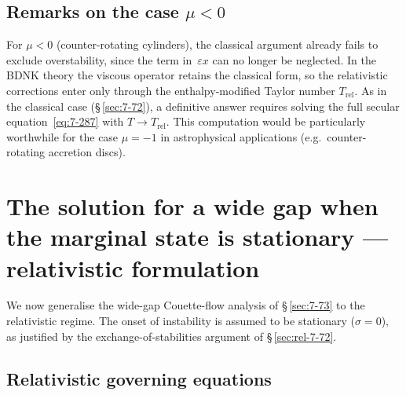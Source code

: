 \subsection{Remarks on the case $\mu < 0$}
\label{sec:rel-7-72c}

For $\mu < 0$ (counter-rotating cylinders), the classical argument
already fails to exclude overstability, since the term in~$\varepsilon x$
can no longer be neglected.  In the BDNK theory the viscous operator
retains the classical form, so the relativistic corrections enter only
through the enthalpy-modified Taylor number $T_{\mathrm{rel}}$.
As in the classical case (\S\,\ref{sec:7-72}), a definitive answer
requires solving the full secular equation~\eqref{eq:7-287} with
$T\to T_{\mathrm{rel}}$.  This computation would be particularly
worthwhile for the case $\mu = -1$ in astrophysical applications
(e.g.\ counter-rotating accretion discs).


\section{The solution for a wide gap when the marginal state is
stationary --- relativistic formulation}
\label{sec:rel-7-73}

We now generalise the wide-gap Couette-flow analysis of
\S\,\ref{sec:7-73} to the relativistic regime.  The onset of
instability is assumed to be stationary ($\sigma=0$), as justified by
the exchange-of-stabilities argument of
\S\,\ref{sec:rel-7-72}.

\subsection{Relativistic governing equations}
\label{sec:rel-7-73-gov}

